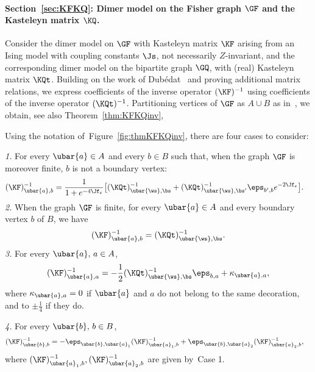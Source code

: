\documentclass[a4paper,twoside,11pt]{article}
\begin{document}
\paragraph{Section~\ref{sec:KFKQ}: Dimer model on the Fisher graph $\GF$ and the Kasteleyn matrix $\KQ$.}
Consider the dimer model on $\GF$ with Kasteleyn matrix $\KF$ arising from an Ising model with coupling constants $\Js$, not necessarily 
$Z$-invariant, and the corresponding dimer model on the bipartite graph $\GQ$, with (real) Kasteleyn matrix $\KQt$. Building 
on the work of Dub\'edat~\cite{Dubedat} and proving additional matrix relations, we express coefficients of the inverse operator 
$(\KF)^{-1}$ using coefficients of the inverse operator $(\KQt)^{-1}$. Partitioning 
vertices of $\GF$ as $A\cup B$ as in~\cite{Dubedat}, we obtain, see also Theorem~\ref{thm:KFKQinv},
\begin{thm}\label{thm:KFKQinv_intro}
Using the notation of~Figure~\ref{fig:thmKFKQinv}, there are four cases to consider:

\emph{1.} For every $\ubar{a}\in A$ and every $b\in B$ such that, when the graph $\GF$ is moreover finite, $b$ is not a boundary vertex:
\begin{align*}\label{form:KABm1_intro}
(\KF)^{-1}_{\ubar{a},b}&=\frac{1}{1+e^{-4\Jf_e}}
\bigl[(\KQt)^{-1}_{\ubar{\ws},\bs} + (\KQt)^{-1}_{\ubar{\ws},\bs'}\eps_{b',b}e^{-2\Jf_e}\bigr].
\end{align*}
\emph{2.} When the graph $\GF$ is finite, for every $\ubar{a}\in A$ and every boundary vertex $b$ of $B$, we have
\begin{equation*}\label{form:KABm1_finite_intro}
(\KF)^{-1}_{\ubar{a},b}=(\KQt)^{-1}_{\ubar{\ws},\bs}.
\end{equation*}
\emph{3.} For every $\ubar{a},\,a\in A$,
\begin{equation*}\label{form:KAAm1_intro}
(\KF)^{-1}_{\ubar{a},a}=-\frac{1}{2}(\KQt)^{-1}_{\ubar{\ws},\bs}\eps_{b,a}+\kappa_{\ubar{a},a},
\end{equation*}
where $\kappa_{\ubar{a},a}=0$ if $\ubar{a}$ and $a$ do not belong to the same decoration, and to $\pm \frac{1}{4}$ if they do.

\emph{4.} For every $\ubar{b},\,b\in B$,
\begin{align*}\label{form:KBBm1_intro}
(\KF)^{-1}_{\ubar{b},b}&=-\eps_{\ubar{b},\ubar{a}_1}(\KF)^{-1}_{\ubar{a}_1,b}+\eps_{\ubar{b},\ubar{a}_2}(\KF)^{-1}_{\ubar{a}_2,b},
\end{align*}
where $(\KF)^{-1}_{\ubar{a}_1,b},(\KF)^{-1}_{\ubar{a}_2,b}$ are given by~Case 1.
\end{thm}
\end{document}
